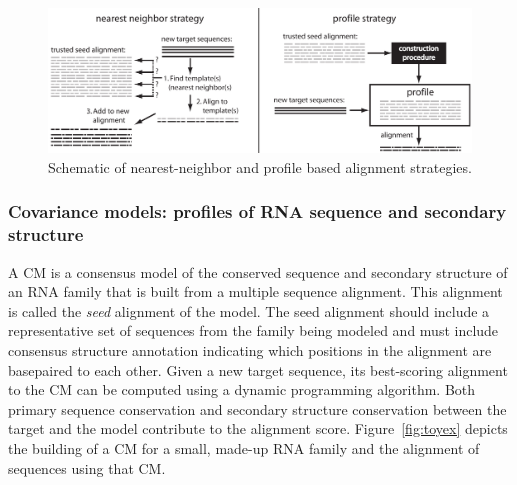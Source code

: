\begin{figure}[hb]
  \begin{center}
\includegraphics[width=6in]{Figures/nnprof}
  \end{center}
  \caption{Schematic of nearest-neighbor and
        profile based alignment strategies.}
  \label{fig:nnprof}
\end{figure}

\subsubsection{Covariance models: profiles of RNA sequence and secondary structure}

A CM is a consensus model of the conserved sequence and secondary
structure of an RNA family that is built from a multiple sequence
alignment. This alignment is called the \emph{seed}
alignment of the model. The seed alignment should
include a representative set of sequences from the family being
modeled and must include consensus structure annotation indicating
which positions in the alignment are basepaired to each other.  Given
a new target sequence, its best-scoring alignment to the CM can be
computed using a dynamic programming algorithm. Both primary
sequence conservation and secondary structure conservation between the target
and the model contribute to the alignment score.
Figure~\ref{fig:toyex} depicts the building of a CM for a small,
made-up RNA family and the alignment of sequences using that CM.


